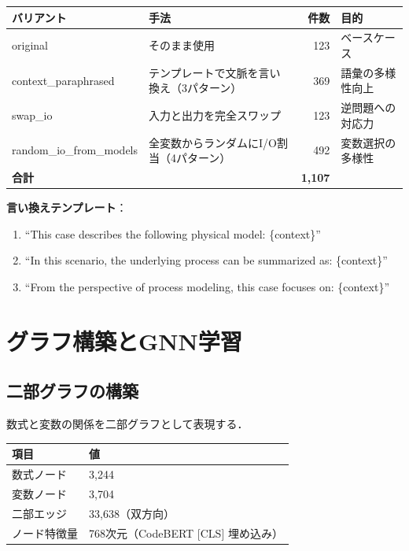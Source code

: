 \documentclass[11pt,a4paper]{ltjsarticle}
\begin{document}
\begin{table}[h]
\centering
\begin{tabular}{llrl}
\toprule
バリアント & 手法 & 件数 & 目的 \\
\midrule
original & そのまま使用 & 123 & ベースケース \\
context\_paraphrased & テンプレートで文脈を言い換え（3パターン） & 369 & 語彙の多様性向上 \\
swap\_io & 入力と出力を完全スワップ & 123 & 逆問題への対応力 \\
random\_io\_from\_models & 全変数からランダムにI/O割当（4パターン） & 492 & 変数選択の多様性 \\
\midrule
\textbf{合計} & & \textbf{1,107} & \\
\bottomrule
\end{tabular}
\end{table}

\textbf{言い換えテンプレート}：
\begin{enumerate}[nosep]
  \item ``This case describes the following physical model: \{context\}''
  \item ``In this scenario, the underlying process can be summarized as: \{context\}''
  \item ``From the perspective of process modeling, this case focuses on: \{context\}''
\end{enumerate}

\section{グラフ構築とGNN学習}

\subsection{二部グラフの構築}

数式と変数の関係を二部グラフとして表現する．

\begin{table}[h]
\centering
\begin{tabular}{ll}
\toprule
項目 & 値 \\
\midrule
数式ノード & 3,244 \\
変数ノード & 3,704 \\
二部エッジ & 33,638（双方向） \\
ノード特徴量 & 768次元（CodeBERT [CLS] 埋め込み） \\
\bottomrule
\end{tabular}
\end{table}
\end{document}
